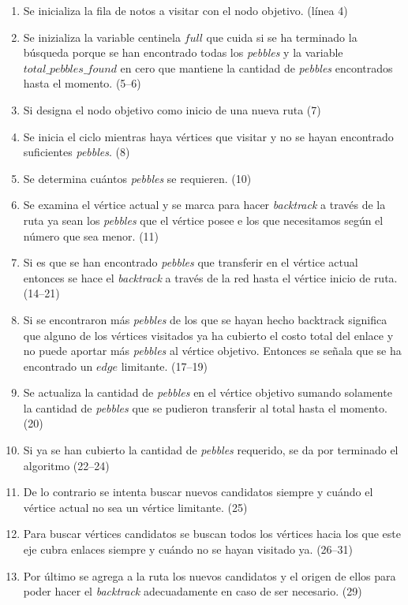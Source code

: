 \begin{enumerate}
	\item Se inicializa la fila de notos a visitar con el nodo objetivo. (línea 4)
	\item Se inizializa la variable centinela $full$ que cuida si se ha terminado la búsqueda porque se han encontrado todas los \emph{pebbles} y la variable $total\_pebbles\_found$ en cero que mantiene la cantidad de \emph{pebbles} encontrados hasta el momento. (5--6)
	\item Si designa el nodo objetivo como inicio de una nueva ruta (7)
	\item Se inicia el ciclo mientras haya vértices que visitar y no se hayan encontrado suficientes \emph{pebbles}. (8)
	\item Se determina cuántos \emph{pebbles} se requieren. (10)
	\item Se examina el vértice actual y se marca para hacer \emph{backtrack} a través de la ruta ya sean los \emph{pebbles} que el vértice posee e los que necesitamos según el número que sea menor. (11)
	\item Si es que se han encontrado \emph{pebbles} que transferir en el vértice actual entonces se hace el \emph{backtrack} a través de la red hasta el vértice inicio de ruta. (14--21)
	\item Si se encontraron más \emph{pebbles} de los que se hayan hecho backtrack significa que alguno de los vértices visitados ya ha cubierto el costo total del enlace y no puede aportar más \emph{pebbles} al vértice objetivo. Entonces se señala que se ha encontrado un $edge$ limitante. (17--19)
	\item Se actualiza la cantidad de \emph{pebbles} en el vértice objetivo sumando solamente la cantidad de \emph{pebbles} que se pudieron transferir al total hasta el momento. (20)
	\item Si ya se han cubierto la cantidad de \emph{pebbles} requerido, se da por terminado el algoritmo (22--24)
	\item De lo contrario se intenta buscar nuevos candidatos siempre y cuándo el vértice actual no sea un vértice limitante. (25)
	\item Para buscar vértices candidatos se buscan todos los vértices hacia los que este eje cubra enlaces siempre y cuándo no se hayan visitado ya. (26--31)
	\item Por último se agrega a la ruta los nuevos candidatos y el origen de ellos para poder hacer el \emph{backtrack} adecuadamente en caso de ser necesario. (29)
\end{enumerate}


